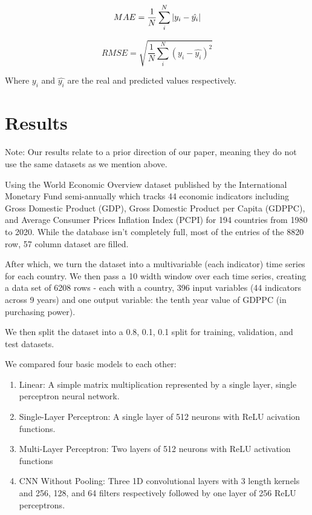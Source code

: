 \documentclass[final]{cvpr}
\begin{document}
    \begin{equation}
        MAE = \frac{1}{N}\sum_i^N|y_i - \hat{y_i}| \\
    \end{equation}

    \begin{equation}
        RMSE = \sqrt{\frac{1}{N}\sum_i^N(y_i - \hat{y_i})^2}
    \end{equation}

    Where $y_i$ and $\hat{y_i}$ are the real and predicted values respectively.

\section{Results}

    Note: Our results relate to a prior direction of our paper, meaning they do not
    use the same datasets as we mention above.

    Using the World Economic Overview dataset published by the International
    Monetary Fund semi-annually which tracks 44 economic indicators including
    Gross Domestic Product (GDP), Gross Domestic Product per Capita (GDPPC), and
    Average Consumer Prices Inflation Index (PCPI) for 194 countries from 1980
    to 2020. While the database isn't completely full, most of the entries of
    the 8820 row, 57 column dataset are filled.

    After which, we turn the dataset into a multivariable (each indicator) time
    series for each country. We then pass a 10 width window over each time
    series, creating a data set of 6208 rows - each with a country, 396 input
    variables (44 indicators across 9 years) and one output variable: the tenth
    year value of GDPPC (in purchasing power).

    We then split the dataset into a 0.8, 0.1, 0.1 split for training,
    validation, and test datasets.

    We compared four basic models to each other:
    \begin{enumerate}
        \item Linear: A simple matrix multiplication represented by a single layer,
            single perceptron neural network.

        \item Single-Layer Perceptron: A single layer of 512 neurons with ReLU
            acivation functions.

        \item Multi-Layer Perceptron: Two layers of 512 neurons with ReLU
            activation functions

        \item CNN Without Pooling: Three 1D convolutional layers with 3 length
            kernels and 256, 128, and 64 filters respectively followed by one
            layer of 256 ReLU perceptrons.
    \end{enumerate}
\end{document}
